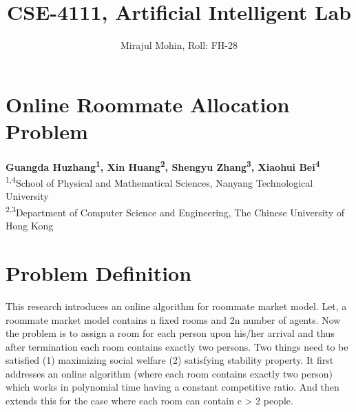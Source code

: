 \documentclass[12pt]{article}
\begin{document}
 
 
\title{CSE-4111, Artificial Intelligent Lab}
\author{Mirajul Mohin, Roll: FH-28\\ %
}

\maketitle
\section*{\centering Online Roommate Allocation Problem}
\centering\textbf{Guangda Huzhang\textsuperscript1, Xin Huang\textsuperscript2, Shengyu Zhang\textsuperscript3, Xiaohui Bei\textsuperscript4}\\
\textsuperscript{1,4}School of Physical and Mathematical Sciences, Nanyang Technological University\\
\textsuperscript{2,3}Department of Computer Science and Engineering, The Chinese University of Hong Kong \\
\raggedright
\section*{Problem Definition}
\justify This research introduces an online algorithm for roommate market model. Let, a roommate market model contains n fixed rooms and 2n number of agents. Now the problem is to assign a room for each person upon his/her arrival and thus after termination each room contains exactly two persons. Two things need to be satisfied (1) maximizing social welfare (2) satisfying stability property. It first addresses an online algorithm (where each room contains exactly two person) which works in polynomial time having a constant competitive ratio. And then extends this for the case where each room can contain c > 2 people.
\end{document}
